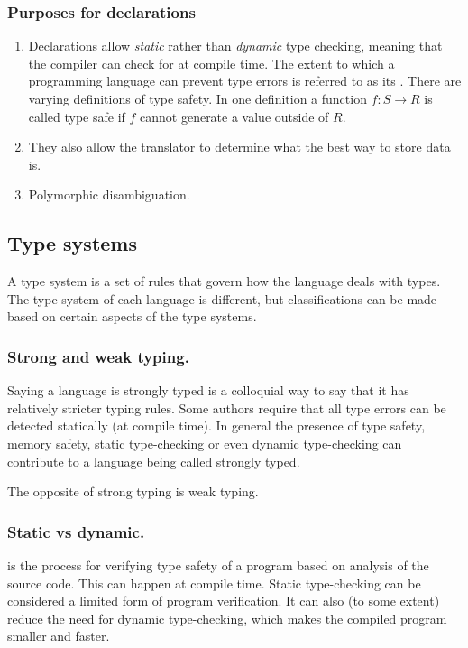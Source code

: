 \subsubsection{Purposes for declarations}
\begin{enumerate}
\item Declarations allow \textit{static} rather than \textit{dynamic} type checking, meaning that the compiler can check for  at compile time. The extent to which a programming language can prevent type errors is referred to as its . There are varying definitions of type safety. In one definition a function $f:S\to R$ is called type safe if $f$ cannot generate a value outside of $R$.
\item They also allow the translator to determine what the best way to store data is.
\item Polymorphic disambiguation.
\end{enumerate}

\subsection{Type systems}
A type system is a set of rules that govern how the language deals with types. The type system of each language is different, but classifications can be made based on certain aspects of the type systems.
\subsubsection{Strong and weak typing.}
Saying a language is strongly typed is a colloquial way to say that it has relatively stricter typing rules. Some authors require that all type errors can be detected statically (at compile time). In general the presence of type safety, memory safety, static type-checking or even dynamic type-checking can contribute to a language being called strongly typed.

The opposite of strong typing is weak typing.

\subsubsection{Static vs dynamic.}
 is the process for verifying type safety of a program based on analysis of the source code. This can happen at compile time. Static type-checking can be considered a limited form of program verification. It can also (to some extent) reduce the need for dynamic type-checking, which makes the compiled program smaller and faster.

